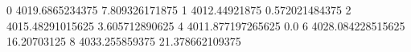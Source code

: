 0 4019.6865234375 7.809326171875
1 4012.44921875 0.572021484375
2 4015.48291015625 3.605712890625
4 4011.877197265625 0.0
6 4028.084228515625 16.20703125
8 4033.255859375 21.378662109375
